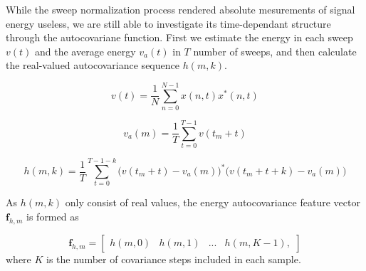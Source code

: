 While the sweep normalization process rendered absolute mesurements of signal energy useless, we are still able to investigate its time-dependant structure through the autocovariane function. First we estimate the energy in each sweep $v(t)$ and the average energy $v_a(t)$ in $T$ number of sweeps, and then calculate the real-valued autocovariance sequence $h(m,k)$. 

\begin{equation}
	v(t) = \frac{1}{N}\sum_{n=0}^{N-1}x(n,t)x^*(n,t)
\end{equation}

\begin{equation} 
	v_a(m) = \frac{1}{T}\sum_{t=0}^{T-1}v(t_m+t)
\end{equation}

\begin{equation}
	h(m,k) = \frac{1}{T}\sum_{t=0}^{T-1-k}\big(v(t_m+t) - v_a(m)\big)^*\big(v(t_m+t+k) - v_a(m)\big)
\end{equation}

As $h(m,k)$ only consist of real values, the energy autocovariance feature vector $\mathbf{f}_{h,m}$ is formed as

\begin{equation}
	\mathbf{f}_{h,m} = 
	\begin{bmatrix}
		h(m,0) & h(m,1) & ... & h(m,K-1),
	\end{bmatrix}
\end{equation}
where $K$ is the number of covariance steps included in each sample. 




